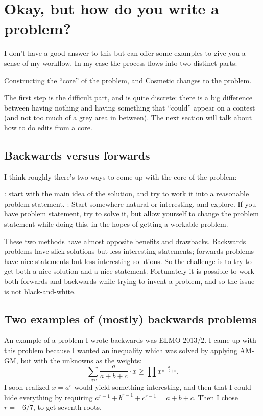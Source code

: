 \documentclass[11pt]{scrartcl}
\renewcommand{\vonenvname}{inlineprob}
\theoremstyle{inlined}
\begin{document}
\section{Okay, but how do you write a problem?}
\renewcommand{\vonenvname}{example}
I don't have a good answer to this but can offer some examples
to give you a sense of my workflow.
In my case the process flows into two distinct parts:
\begin{itemize}
  \ii Constructing the ``core'' of the problem, and
  \ii Cosmetic changes to the problem.
\end{itemize}
The first step is the difficult part, and is quite discrete:
there is a big difference between having nothing
and having something that ``could'' appear on a contest
(and not too much of a grey area in between).
The next section will talk about how to do edits from a core.

\subsection{Backwards versus forwards}
I think roughly there's two ways to come up with the core of the problem:
\begin{itemize}
  \ii {}:
  start with the main idea of the solution,
  and try to work it into a reasonable problem statement.
  \ii {}: Start somewhere natural or interesting, and explore.
  If you have problem statement, try to solve it,
  but allow yourself to change the problem statement while doing this,
  in the hopes of getting a workable problem.
\end{itemize}

These two methods have almost opposite benefits and drawbacks.
Backwards problems have slick solutions but less interesting statements;
forwards problems have nice statements but less interesting solutions.
So the challenge is to try to get both a nice solution and a nice statement.
Fortunately it is possible to work both forwards and backwards
while trying to invent a problem, and so the issue is not black-and-white.

\subsection{Two examples of (mostly) backwards problems}
An example of a problem I wrote backwards was ELMO 2013/2.
I came up with this problem because I wanted an inequality
which was solved by applying AM-GM,
but with the unknowns as the weights:
\[ \sum_{\text{cyc}} \frac{a}{a+b+c} \cdot x \ge \prod x^{\frac{a}{a+b+c}}. \]
I soon realized $x = a^r$ would yield something interesting,
and then that I could hide everything by
requiring $a^{r-1} + b^{r-1} + c^{r-1} = a+b+c$.
Then I chose $r = -6/7$, to get seventh roots.
\end{document}

